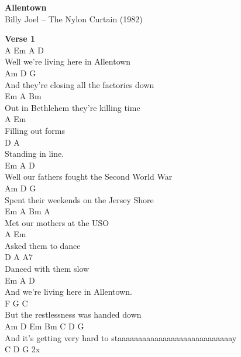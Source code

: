 \documentclass[a4paper]{article}
\begin{document}
    \begin{center}
        \textbf{Allentown}
        ~\\
        Billy Joel -- The Nylon Curtain (1982)
    \end{center}
    {
        \scriptsize
        \textbf{Verse 1}
        ~\\
        {
            \cutive
            \obeyspaces
A          Em             A    D
\\
Well we're living here in Allentown
\\
            Am              D         G
\\
And they're closing all the factories down
\\
       Em                A       Bm
\\
Out in Bethlehem they're killing time
\\
A           Em
\\
Filling out forms
\\
D           A
\\
Standing in line.
\\
         Em                 A            D
\\
Well our fathers fought the Second World War
\\
            Am              D      G
\\
Spent their weekends on the Jersey Shore
\\
        Em             A Bm  A
\\
Met our mothers at the USO
\\
A             Em
\\
Asked them to dance
\\
D                A   A7
\\
Danced with them slow
\\
          Em             A    D
\\
And we're living here in Allentown.
\\
        F                G      C
\\
But the restlessness was handed down
\\
         Am           D       Em                    Bm       C D G
\\
And it's getting very hard to staaaaaaaaaaaaaaaaaaaaaaaaaaaay
\\
C D G 2x
\\

}}
\end{document}
